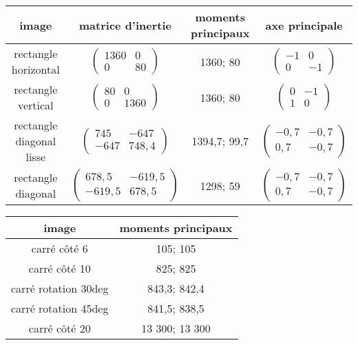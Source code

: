 \documentclass{article}
\begin{document}
  \begin{tabular}{|c|c|c|c|}
    \hline
    \textbf{image} & \textbf{matrice d'inertie} & \textbf{moments principaux} & \textbf{axe principale} \\
    \hline
    rectangle horizontal & $\begin{pmatrix}
			    1360 & 0 \\
			    0 & 80 
			    \end{pmatrix}$ 
			 & 1360; 80
			 &  $\begin{pmatrix}
			    -1 & 0 \\
			    0 & -1 
			    \end{pmatrix}$\\
    \hline
    rectangle vertical & $\begin{pmatrix}
			    80 & 0 \\
			    0 & 1360 
			    \end{pmatrix}$
			& 1360; 80
			&  $\begin{pmatrix}
			    0 & -1 \\
			    1 & 0 
			    \end{pmatrix}$\\
    \hline
    rectangle diagonal lisse & $\begin{pmatrix}
			    745 & -647 \\
			    -647 & 748,4 
			    \end{pmatrix}$
			 & 1394,7; 99,7
			 &  $\begin{pmatrix}
			    -0,7 & -0,7 \\
			    0,7 & -0,7 
			    \end{pmatrix}$\\
    \hline
    rectangle diagonal & $\begin{pmatrix}
			    678,5 & -619,5 \\
			    -619,5 & 678,5 
			    \end{pmatrix}$
			 & 1298; 59
			 &  $\begin{pmatrix}
			    -0,7 & -0,7 \\
			    0,7 & -0,7 
			    \end{pmatrix}$\\
    \hline
  \end{tabular}
  
  
  \begin{center}
    \begin{tabular}{|c|c|}
      \hline
      \textbf{image} & \textbf{moments principaux} \\
      \hline
      carré côté 6 & 105; 105 \\
      \hline
      carré côté 10 & 825; 825 \\
      \hline
      carré rotation 30deg & 843,3; 842,4 \\
      \hline
      carré rotation 45deg & 841,5; 838,5 \\
      \hline
      carré côté 20 & 13 300; 13 300 \\
      \hline
    \end{tabular}
  \end{center}
  
\end{document}
